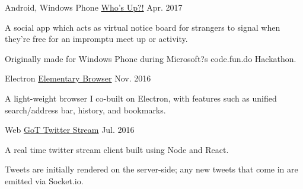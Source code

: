 

\begin{cventries}

  \cventry
    {Android, Windows Phone} %
    {\href{https://github.com/Whos-Up-Team/WhosUp}{Who's Up?!}} %
    {} %
    {Apr. 2017} %
    {
      \begin{cvitems} %
        \item {A social app which acts as virtual notice board for strangers to signal when
they're free for an impromptu meet up or activity.}
		\item {Originally made for Windows Phone during Microsoft?s code.fun.do Hackathon.}
      \end{cvitems}
    }

  \cventry
    {Electron} %
    {\href{https://github.com/azwreith/elementary-browser}{Elementary Browser}} %
    {} %
    {Nov. 2016} %
    {
      \begin{cvitems} %
        \item {A light-weight browser I co-built on Electron, with features such as unified search/address bar, history, and bookmarks.}
      \end{cvitems}
    }

  \cventry
    {Web} %
    {\href{https://github.com/azwreith/got-twitter-stream}{GoT Twitter Stream}} %
    {} %
    {Jul. 2016} %
    {
      \begin{cvitems} %
        \item {A real time twitter stream client built using Node and React.}
        \item {Tweets are initially rendered on the server-side; any new tweets that come in are emitted via Socket.io.}
      \end{cvitems}
    }

\end{cventries}
